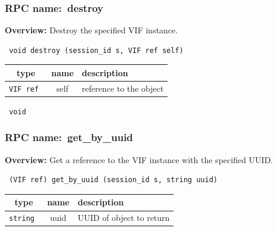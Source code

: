 \subsubsection{RPC name:~destroy}

{\bf Overview:} 
Destroy the specified VIF instance.

\begin{verbatim} void destroy (session_id s, VIF ref self)\end{verbatim}



 
\vspace{0.3cm}
\begin{tabular}{|c|c|p{7cm}|}
 \hline
{\bf type} & {\bf name} & {\bf description} \\ \hline
{\tt VIF ref } & self & reference to the object \\ \hline 

\end{tabular}

\vspace{0.3cm}

{\tt 
void
}



\vspace{0.3cm}
\vspace{0.3cm}
\vspace{0.3cm}
\subsubsection{RPC name:~get\_by\_uuid}

{\bf Overview:} 
Get a reference to the VIF instance with the specified UUID.

\begin{verbatim} (VIF ref) get_by_uuid (session_id s, string uuid)\end{verbatim}



 
\vspace{0.3cm}
\begin{tabular}{|c|c|p{7cm}|}
 \hline
{\bf type} & {\bf name} & {\bf description} \\ \hline
{\tt string } & uuid & UUID of object to return \\ \hline 

\end{tabular}

\vspace{0.3cm}

